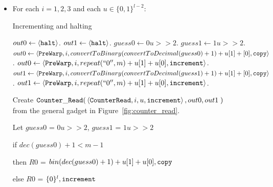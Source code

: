 \begin{itemize}

    \item For each $i = 1,2,3$ and each $u \in \{0, 1\}^{l-2} $:
    \begin{algorithm}
        \caption{Incrementing and halting}\label{euclid}
        \begin{algorithmic}[1]
                    \State $out0 \gets \left\langle {\tt halt} \right\rangle$.
                    \State $out1 \gets \left\langle {\tt halt} \right\rangle$.
                \Else
                    \State $guess0 \gets 0u >> 2$.
                    \State $guess1 \gets 1u >> 2$.
                        \State $out0 \gets \left\langle {\tt PreWarp}, i, convertToBinary(convertToDecimal(guess0) + 1) + u[1] + [0], {\tt copy} \right\rangle$.
                    \Else
                        \State $out0 \gets \left\langle {\tt PreWarp}, i, repeat(``0'', m) + u[1] + u[0], {\tt increment} \right\rangle$.
                    \EndIf
                        \State $out1 \gets \left\langle {\tt PreWarp}, i, convertToBinary(convertToDecimal(guess1) + 1) + u[1] + [0], {\tt copy} \right\rangle$.
                    \Else
                        \State $out1 \gets \left\langle {\tt PreWarp}, i, repeat(``0'', m) + u[1] + u[0], {\tt increment} \right\rangle$.
                    \EndIf
                \EndIf
            \EndFunction
        \end{algorithmic}
    \end{algorithm}

    Create
    $\begin{aligned}[t]
        {\tt Counter\_Read}(& \left\langle {\tt CounterRead}, i, u, {\tt increment} \right\rangle, out0, out1 \;)
    \end{aligned}$\\from the general gadget in Figure~\ref{fig:counter_read}.

    Let $guess0$ = $0u >> 2$, $guess1$ = $1u >> 2$

    \vspace{.5cm}
    if $dec(guess0) + 1 < m - 1$

    then $R0$ = $bin(dec(guess0) + 1)+u[1]+u[0], {\tt copy}$

    else $R0$ = $\{0 \}^l, {\tt increment}$


\end{itemize}
